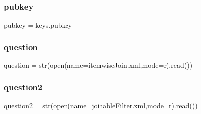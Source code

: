 \subsubsection{\texorpdfstring{pubkey}{pubkey}}
{\footnotesize\ttfamily pubkey = keys.\+pubkey}

\mbox{\label{namespacecreate__tasks_a1a1b6bd27a93f9139a2f44d01f7b3ad1}} 
\subsubsection{\texorpdfstring{question}{question}}
{\footnotesize\ttfamily question = str(open(name=\textquotesingle{}itemwise\+Join.\+xml\textquotesingle{},mode=\textquotesingle{}r\textquotesingle{}).read())}

\mbox{\label{namespacecreate__tasks_a2abfda5d0d7716cccbef2ea0b8b6374f}} 
\subsubsection{\texorpdfstring{question2}{question2}}
{\footnotesize\ttfamily question2 = str(open(name=\textquotesingle{}joinable\+Filter.\+xml\textquotesingle{},mode=\textquotesingle{}r\textquotesingle{}).read())}

